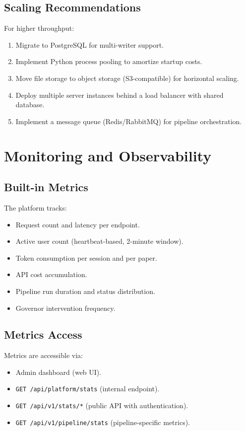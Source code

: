 \subsection{Scaling Recommendations}

For higher throughput:
\begin{enumerate}
  \item Migrate to PostgreSQL for multi-writer support.
  \item Implement Python process pooling to amortize startup costs.
  \item Move file storage to object storage (S3-compatible) for horizontal scaling.
  \item Deploy multiple server instances behind a load balancer with shared database.
  \item Implement a message queue (Redis/RabbitMQ) for pipeline orchestration.
\end{enumerate}

\section{Monitoring and Observability}
\label{sec:perf:monitoring}

\subsection{Built-in Metrics}

The platform tracks:
\begin{itemize}
  \item Request count and latency per endpoint.
  \item Active user count (heartbeat-based, 2-minute window).
  \item Token consumption per session and per paper.
  \item API cost accumulation.
  \item Pipeline run duration and status distribution.
  \item Governor intervention frequency.
\end{itemize}

\subsection{Metrics Access}

Metrics are accessible via:
\begin{itemize}
  \item Admin dashboard (web UI).
  \item \texttt{GET /api/platform/stats} (internal endpoint).
  \item \texttt{GET /api/v1/stats/*} (public API with authentication).
  \item \texttt{GET /api/v1/pipeline/stats} (pipeline-specific metrics).
\end{itemize}
